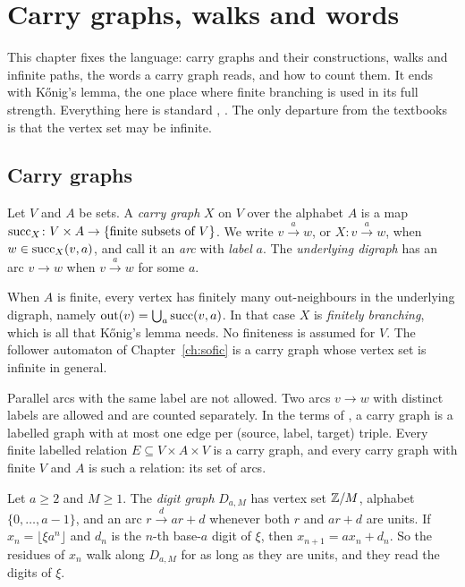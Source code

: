 \chapter{Carry graphs, walks and words}\label{ch:graphs}

This chapter fixes the language: carry graphs and their constructions, walks and infinite
paths, the words a carry graph reads, and how to count them. It ends with Kőnig's lemma, the
one place where finite branching is used in its full strength. Everything here is standard
\cite[§1.3, §2.2, §3.1]{LM95}, \cite[§1.2--1.4]{BJG09}. The only departure from the textbooks
is that the vertex set may be infinite.

\section{Carry graphs}

\begin{definition}\label{def:carry-graph}
Let \(V\) and \(A\) be sets. A \emph{carry graph} \(X\) on \(V\) over the alphabet \(A\) is a
map \(\operatorname{succ}_X\colon V\times A\to\{\text{finite subsets of }V\}\). We write
\(v\xrightarrow{a}w\), or \(X\colon v\xrightarrow{a}w\), when \(w\in\operatorname{succ}_X(v,a)\), and call it
an \emph{arc} with \emph{label} \(a\). The \emph{underlying digraph} has an arc \(v\to w\) when
\(v\xrightarrow{a}w\) for some \(a\).
\end{definition}

When \(A\) is finite, every vertex has finitely many out-neighbours in the underlying digraph,
namely \(\operatorname{out}(v)=\bigcup_a\operatorname{succ}(v,a)\). In that case \(X\) is \emph{finitely
branching}, which is all that Kőnig's lemma needs. No finiteness is assumed for \(V\).
The follower automaton of Chapter~\ref{ch:sofic} is a carry graph whose vertex set is infinite
in general.

Parallel arcs with the same label are not allowed. Two arcs \(v\to w\) with distinct labels
are allowed and are counted separately. In the terms of \cite[§3.1]{LM95}, a carry graph is a
labelled graph with at most one edge per (source, label, target) triple. Every finite labelled
relation \(E\subseteq V\times A\times V\) is a carry graph, and every carry graph with finite
\(V\) and \(A\) is such a relation: its set of arcs.

\begin{example}\label{ex:digit}
Let \(a\ge2\) and \(M\ge1\). The \emph{digit graph} \(D_{a,M}\) has vertex set \(\mathbb{Z}/M\),
alphabet \(\{0,\dots,a-1\}\), and an arc \(r\xrightarrow{d}ar+d\) whenever both \(r\) and
\(ar+d\) are units. If \(x_n=\lfloor\xi a^n\rfloor\) and \(d_n\) is the \(n\)-th base-\(a\)
digit of \(\xi\), then \(x_{n+1}=ax_n+d_n\). So the residues of \(x_n\) walk along \(D_{a,M}\)
for as long as they are units, and they read the digits of \(\xi\).
\end{example}

